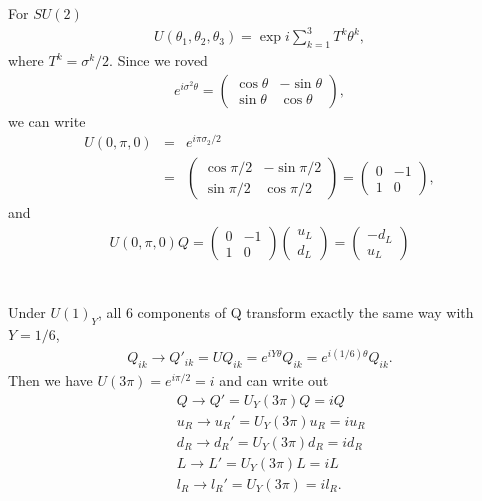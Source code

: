 \documentclass[11pt]{article}
\begin{document}
\section{ }
For $SU(2)$
\begin{eqnarray}
  U(\theta_1,\theta_2,\theta_3) = \exp{ i \sum_{k=1}^3 T^k \theta^k},
\end{eqnarray}
where $T^k= \sigma^k/2$. 
Since we roved 
\begin{eqnarray}
  e^{i \sigma^2 \theta}=
  \begin{pmatrix}
    \cos \theta & -\sin \theta\\
    \sin \theta & \cos \theta
  \end{pmatrix},
\end{eqnarray}
 we can write
\begin{eqnarray}
  U(0,\pi,0)&=&e^{i \pi \sigma_2 /2} \\
  &=&
  \begin{pmatrix}
    \cos \pi/2 & -\sin \pi/2\\
    \sin \pi/2 & \cos \pi/2
  \end{pmatrix}
  =  \begin{pmatrix}
    0 & -1\\
    1 & 0
  \end{pmatrix},
\end{eqnarray}
and
\begin{eqnarray}
  U(0,\pi,0) Q =
  \begin{pmatrix}
    0 & -1\\
    1 & 0
  \end{pmatrix}
  \begin{pmatrix}
    u_L\\
    d_L
  \end{pmatrix}
  =
  \begin{pmatrix}
    -d_L\\
    u_L
  \end{pmatrix}
\end{eqnarray}

\section{ }
Under $U(1)_Y$, all 6 components of Q transform exactly the same way with $Y=1/6$, 
\begin{eqnarray}
  Q_{ik} \to Q'_{ik} = U Q_{ik}
                 = e^{iY\theta} Q_{ik}
                 = e^{i(1/6)\theta} Q_{ik}.
\end{eqnarray}
Then we have $U(3\pi)=e^{i\pi/2}=i$ and can write out
\begin{eqnarray}
  &&  Q \to Q'  = U_Y(3\pi) Q = iQ\\
  && u_R \to u_R' = U_Y(3\pi) u_R = i u_R\\
  && d_R \to d_R' = U_Y(3\pi) d_R = i d_R\\
  && L  \to L'  = U_Y(3\pi) L= iL\\
  && l_R \to l_R' = U_Y(3\pi) =  il_R.
\end{eqnarray}
\end{document}
